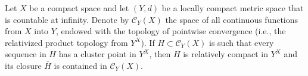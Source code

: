 Let $X$ be a compact space and let $(Y, d)$ be a locally compact metric space that is countable at infinity. Denote by $\mathcal{C}_Y(X)$ the space of all continuous functions from $X$ into $Y$, endowed with the topology of pointwise convergence (i.e., the relativized product topology from $Y^X$). If $H \subset \mathcal{C}_Y(X)$ is such that every sequence in $H$ has a cluster point in $Y^X$, then $H$ is relatively compact in $Y^X$ and its closure $\overline{H}$ is contained in $\mathcal{C}_Y(X)$.
